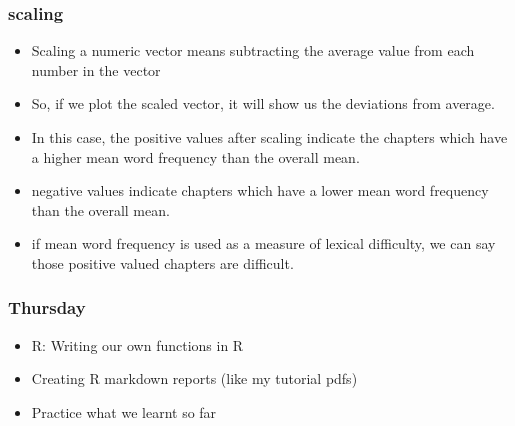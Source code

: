 \documentclass{beamer}
\begin{document}
\begin{frame}
\frametitle{scaling}
\begin{itemize}
\item Scaling a numeric vector means subtracting the average value from each number in the vector
\item So, if we plot the scaled vector, it will show us the deviations from average. \pause
\item In this case, the positive values after scaling indicate the chapters which have a higher mean word frequency than the overall mean.
\item negative values indicate chapters which have a lower mean word frequency than the overall mean. \pause
\item if mean word frequency is used as a measure of lexical difficulty, we can say those positive valued chapters are difficult.  
\end{itemize}
\end{frame}


\begin{frame}
\frametitle{Thursday}
\begin{itemize}
\item R: Writing our own functions in R
\item Creating R markdown reports (like my tutorial pdfs)
\item Practice what we learnt so far
\end{itemize}
\end{frame}
\end{document}
